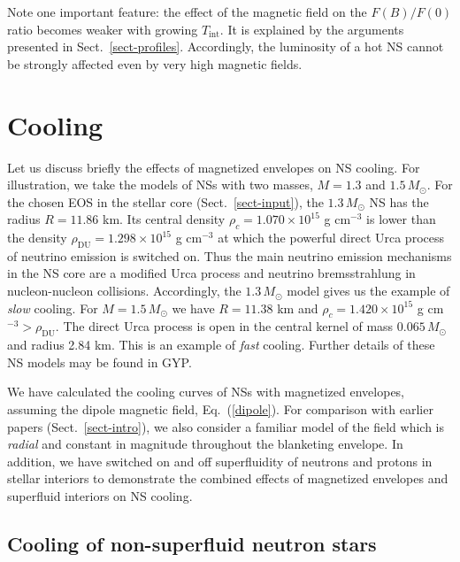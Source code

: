 \documentclass{aa}
\begin{document}
Note one important feature: the effect of the
magnetic field on the $F(B)/F(0)$
ratio becomes weaker with growing $T_\mathrm{int}$.
It is explained by the arguments presented
in Sect.\ \ref{sect-profiles}.
Accordingly, the luminosity
of a hot NS cannot be strongly affected even
by very high magnetic fields.

\section{Cooling}
\label{sect-cool}

Let us discuss briefly the effects of
magnetized envelopes on NS cooling.
For illustration, we take the models of
NSs with two masses, $M=1.3$ and $1.5 \, M_\odot$.
For the chosen EOS in the stellar
core (Sect.\ \ref{sect-input}),
the $1.3 \, M_\odot$ NS has the radius $R=11.86$ km.
Its central density $\rho_c=1.070 \times 10^{15}$ g cm$^{-3}$
is lower than the density $\rho_\mathrm{DU}=1.298 \times 10^{15}$
g cm$^{-3}$ at which the powerful direct Urca process
of neutrino emission is switched on. Thus the
main neutrino emission mechanisms in the NS core are
a modified Urca process and neutrino bremsstrahlung in
nucleon-nucleon collisions. Accordingly, the $1.3 \, M_\odot$
model gives us the example of \emph{slow} cooling.
For $M = 1.5 \, M_\odot$ we have $R=11.38$ km
and $\rho_c=1.420 \times 10^{15}$ g cm$^{-3} > \rho_\mathrm{DU}$.
The direct Urca process is open in the central kernel
of mass $0.065 \, M_\odot$ and radius 2.84 km.
This is an example of \emph{fast} cooling.
Further details of these NS models may be found
in GYP.

We have calculated the cooling curves of NSs
with magnetized envelopes, assuming
the dipole magnetic field, Eq.\ (\ref{dipole}).
For comparison with earlier papers (Sect.\ \ref{sect-intro}),
we also consider a familiar model of
the field which is \emph{radial} and constant
in magnitude throughout the blanketing envelope.
In addition, we have switched on and off
superfluidity of neutrons and
protons in stellar interiors to demonstrate the
combined effects of magnetized envelopes and
superfluid interiors on NS cooling.

\subsection{Cooling of non-superfluid neutron stars}
%
\end{document}
